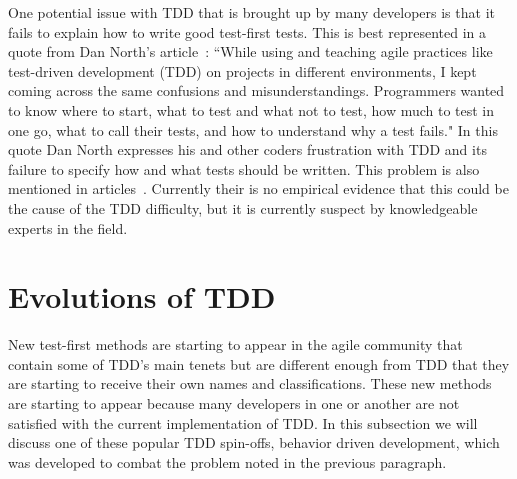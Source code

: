\documentclass{sig-alternate}
\begin{document}
One potential issue with TDD that is brought up by many developers is that it fails to explain how to write good test-first tests.  This is best represented in a quote from Dan North's article~\cite{North:xxx}: ``While using and teaching agile practices like test-driven development (TDD) on projects in different environments, I kept coming across the same confusions and misunderstandings. Programmers wanted to know where to start, what to test and what not to test, how much to test in one go, what to call their tests, and how to understand why a test fails."  In this quote Dan North expresses his and other coders frustration with TDD and its failure to specify how and what tests should be written.  This problem is also mentioned in articles~\cite{Kettunen:2010, Seoken:2012}.  Currently their is no empirical evidence that this could be the cause of the TDD difficulty, but it is currently suspect by knowledgeable experts in the field. 

\section{Evolutions of TDD}

New test-first methods are starting to appear in the agile community that contain some of TDD's main tenets but are different enough from TDD that they are starting to receive their own names and classifications.  These new methods are starting to appear because many developers in one or another are not satisfied with the current implementation of TDD.  In this subsection we will discuss one of these popular TDD spin-offs, behavior driven development, which was developed to combat the problem noted in the previous paragraph.


\end{document}
